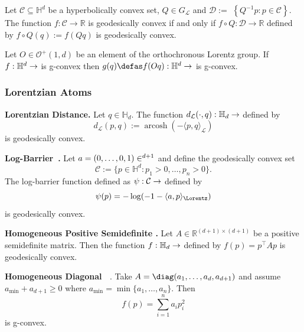 \documentclass[twoside,11pt]{article}
\begin{document}
\begin{prop}\label{prop:lorentz_composition}
    Let $\mathcal{C} \subseteq \mathbb{H}^d$ be a hyperbolically convex set, $Q \in G_{\mathcal{L}}$ and $\mathcal{D}:=$ $\left\{Q^{-1} p: p \in \mathcal{C}\right\}$. The function $f: \mathcal{C} \rightarrow \mathbb{R}$ is geodesically convex if and only if $f \circ Q: \mathcal{D} \rightarrow \mathbb{R}$ defined by $f \circ Q(q):=f(Q q)$ is geodesically convex.
\end{prop}

\begin{remark}
    Let $O \in \mathcal{O}^{+}(1,d)$ be an element of the orthochronous Lorentz group. If $f:\mathbb{H}^d \to \real$ is g-convex then $g(q) \defas f(O q): \mathbb{H}^d \to \real$ is g-convex.
\end{remark}




\subsubsection{Lorentzian Atoms}\label{sec:lorentzian_atoms}

\textbf{Lorentzian Distance.} Let $q \in \mathbb{H}_d$. The function $d_\mathcal{L}(\cdot, q): \mathbb{H}_d \to \real$ defined by
\[d_\mathcal{L}(p,q) := \operatorname{arcosh}(-\langle p, q \rangle_\mathcal{L})\]
is geodesically convex.

 \textbf{Log-Barrier~\citep{Ferreira2022}.} Let $a = (0, \ldots, 0, 1) \in \real^{d+1}$ and define the geodesically convex set 
\[
\mathcal{C} := \{p \in \mathbb{H}^d: p_1 > 0, \ldots, p_n >0 \}. 
\]
The log-barrier function defined as $\psi: \mathcal{C} \to \real$ defined by 
\[
\psi(p)=-\log  (-1-\langle a, p\rangle_\Lorentz)
\]
is geodesically convex. 

\textbf{Homogeneous Positive Semidefinite \citep{Ferreira2022}.} Let $A \in \mathbb{R}^{(d+1)\times(d+1)}$ be a positive semidefinite matrix. Then the function $f:\mathbb{H}_d \to \real$ defined by $f(p) = p^\top A p$ is geodesically convex.






\textbf{Homogeneous Diagonal ~\citep{Ferreira2022}}.
    Take $A = \diag(a_1, \ldots, a_d, a_{d+1})$ and assume $a_{\min} + a_{d+1} \geq 0$ where $a_{\min} = \min\{a_1, \ldots, a_n\}$. Then 
    \[
    f(p) = \sum_{i=1}^n a_i p_i^2
    \]
    is g-convex. 
\end{document}
